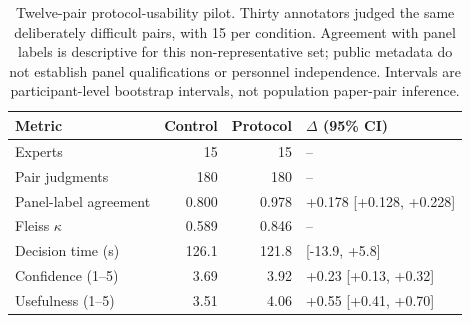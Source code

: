 \begin{table}[t]
\centering
\scriptsize
\setlength{\tabcolsep}{3pt}
\begin{tabularx}{\linewidth}{lrr>{\raggedright\arraybackslash}X}
\toprule
\textbf{Metric} & \textbf{Control} & \textbf{Protocol} & \textbf{$\Delta$ (95\% CI)} \\
\midrule
Experts & 15 & 15 & -- \\
Pair judgments & 180 & 180 & -- \\
Panel-label agreement & 0.800 & 0.978 & +0.178 [+0.128, +0.228] \\
Fleiss $\kappa$ & 0.589 & 0.846 & -- \\
Decision time (s) & 126.1 & 121.8 & -4.3 [-13.9, +5.8] \\
Confidence (1--5) & 3.69 & 3.92 & +0.23 [+0.13, +0.32] \\
Usefulness (1--5) & 3.51 & 4.06 & +0.55 [+0.41, +0.70] \\
\bottomrule
\end{tabularx}
\caption{Twelve-pair protocol-usability pilot. Thirty annotators judged the same deliberately difficult pairs, with 15 per condition. Agreement with panel labels is descriptive for this non-representative set; public metadata do not establish panel qualifications or personnel independence. Intervals are participant-level bootstrap intervals, not population paper-pair inference.}
\label{tab:expert-validation-pilot}
\end{table}
